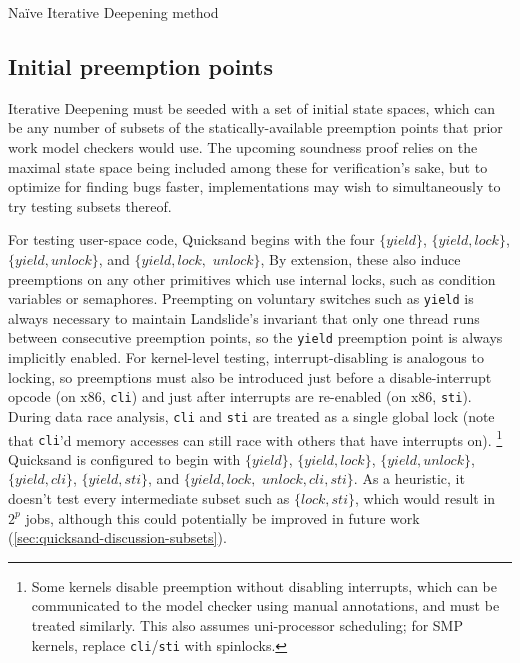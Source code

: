 \begin{algorithm}[t]
	\caption{Na\"ive Iterative Deepening method}
	\label{alg:algorithm0}
\end{algorithm}


\subsection{Initial preemption points}
\label{sec:quicksand-initial-pps}

Iterative Deepening must be seeded with a set of initial state spaces,
which can be any number of subsets of the statically-available preemption points
that prior work model checkers would use.
The upcoming soundness proof relies on the maximal state space being included among these for verification's sake,
but to optimize for finding bugs faster,
implementations may wish to simultaneously to try testing subsets thereof.

For testing user-space code, Quicksand begins with the four
$\{yield\}$,
$\{yield,lock\}$,
$\{yield,unlock\}$,
and $\{yield,lock,$ $unlock\}$, %
By extension, these also induce preemptions on any other primitives
which use
internal locks,
such as condition variables or semaphores.
Preempting on voluntary switches such as {\tt yield} is always necessary to maintain
Landslide's invariant that only one thread runs between consecutive preemption points,
so the {\tt yield} preemption point is always implicitly enabled.
%
For kernel-level testing, interrupt-disabling is analogous to locking,
so preemptions must also be introduced
just before a disable-interrupt opcode (on x86, {\tt cli})
and just after interrupts are re-enabled (on x86, {\tt sti}).
During data race analysis, {\tt cli} and {\tt sti} are treated as a single global lock
(note that {\tt cli}'d memory accesses can still race with others that have interrupts on).%
\footnote{Some kernels disable preemption without disabling interrupts,
which can be communicated to the model checker using manual annotations,
and must be treated similarly.
This also assumes uni-processor scheduling; for SMP kernels, replace {\tt cli}/{\tt sti} with spinlocks.}
Quicksand is configured to begin with
$\{yield\}$,
$\{yield,lock\}$,
$\{yield,unlock\}$,
$\{yield,cli\}$,
$\{yield,sti\}$,
and $\{yield,lock,$ $unlock,cli,sti\}$.
As a heuristic, it doesn't test every intermediate subset such as $\{lock,sti\}$,
which would result in $2^p$ jobs, %
although this could potentially be improved in future work (\cref{sec:quicksand-discussion-subsets}).

